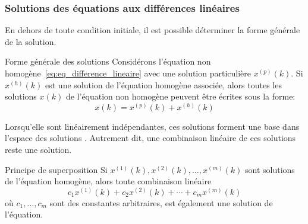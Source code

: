             \subsubsection{Solutions des équations aux différences linéaires}
                En dehors de toute condition initiale, il est possible déterminer la forme générale de la solution.
                \begin{theorem}{Forme générale des solutions} 
                    Considérons l’équation non homogène~\eqref{eq:eq_difference_lineaire} avec une solution particulière $x^{(p)}(k)$. Si $x^{(h)}(k)$ est une solution de l’équation homogène associée, alors toutes les solutions $x(k)$ de l’équation non homogène peuvent être écrites sous la forme:
                    \begin{equation}
                        x(k) = x^{(p)}(k)+x^{(h)}(k)
                    \end{equation}
                \end{theorem}
                Lorsqu'elle sont linéairement indépendantes, ces solutions forment une base dans l'espace des solutions . Autrement dit, une combinaison linéaire de ces solutions reste une solution.  
                \begin{theorem}{Principe de superposition}
                    Si $x^{(1)}(k), x^{(2)}(k), \dots, x^{(m)}(k)$ sont solutions de l'équation homogène, alors toute combinaison linéaire
                    \begin{equation}
                        c_1 x^{(1)}(k)+c_2 x^{(2)}(k)+\cdots+c_m x^{(m)}(k)
                    \end{equation}
                    où $c_1, \dots, c_m$ sont des constantes arbitraires, est également une solution de l'équation.
                \end{theorem}
    
